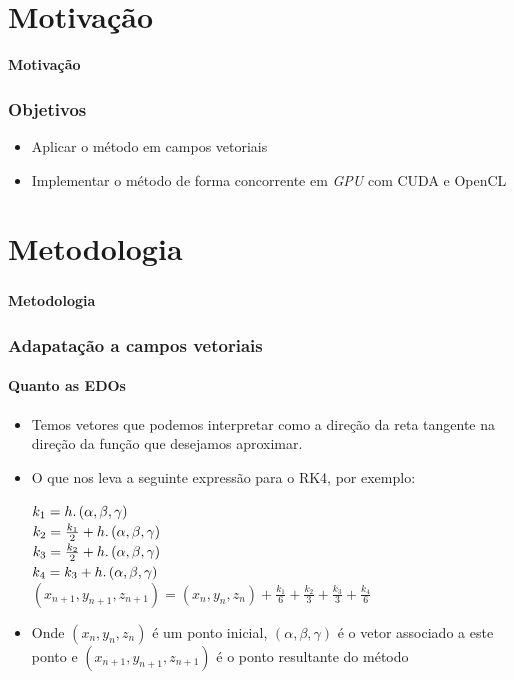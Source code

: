 \documentclass[brazil, 10pt]{beamer}
\begin{document}
\section{Motivação}
\begin{frame}
  \begin{Large}
  \begin{center}
  \textbf{Motivação}
  \end{center}
  \end{Large}
\end{frame}

\begin{frame}
  \frametitle{Objetivos}

  \begin{itemize}
    \item Aplicar o método em campos vetoriais
    \item Implementar o método de forma concorrente em \textit{GPU} com CUDA e OpenCL
  \end{itemize}
\end{frame}

\section{Metodologia}
\begin{frame}
  \frametitle{}
  \framesubtitle{}
  \begin{Large}
  \begin{center}
  \textbf{Metodologia}
  \end{center}
  \end{Large}
\end{frame}

\begin{frame}
  \frametitle{Adapatação a campos vetoriais}
  \framesubtitle{Quanto as EDOs}
  
  \begin{itemize}
    \item Temos vetores que podemos interpretar como a direção da reta tangente na direção da função que desejamos aproximar.
    \item O que nos leva a seguinte expressão para o RK4, por exemplo:

    $k_{1} = h\ldotp (\alpha ,\beta ,\gamma)$\\
    $k_{2} = \frac{k_{1}}{2} + h\ldotp (\alpha ,\beta ,\gamma)$\\
    $k_{3} = \frac{k_{2}}{2} + h\ldotp (\alpha ,\beta ,\gamma)$\\
    $k_{4} = k_{3} + h\ldotp (\alpha ,\beta ,\gamma )$\\
    $(x_{n+1}, y_{n+1}, z_{n+1}) = (x_{n}, y_{n}, z_{n}) + \frac{k_{1}}{6} + \frac{k_{2}}{3} + \frac{k_{3}}{3} + \frac{k_{4}}{6}$
    
    \item Onde $ (x_{n}, y_{n}, z_{n}) $ é um ponto inicial, $(\alpha ,\beta ,\gamma)$ é o vetor associado a este ponto e $ (x_{n+1}, y_{n+1}, z_{n+1}) $ é o ponto resultante do método
  \end{itemize}


\end{frame}
\end{document}

